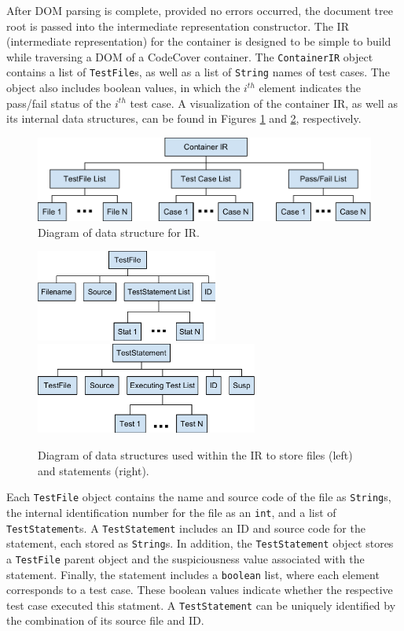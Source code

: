 After DOM parsing is complete, provided no errors occurred, the document tree root is
passed into the intermediate representation constructor.  The IR (intermediate representation)
for the container is designed to be simple to build while traversing a DOM of a CodeCover
container.  The \texttt{ContainerIR} object contains a list of \texttt{TestFile}s, as well
as a list of \texttt{String} names of test cases.  The object also includes boolean values,
in which the $i^{th}$ element indicates the pass/fail status of the $i^{th}$ test case.  A 
visualization of the container IR, as well as its internal data structures, can be found in 
Figures \ref{fig:ir} and \ref{fig:ir2}, respectively.  

\begin{figure}[tb]
\centering
\includegraphics[width=0.8\linewidth]{img/ContainerIR.pdf}
\caption{Diagram of data structure for IR.}
\label{fig:ir}
\end{figure}

\begin{figure}[tb]
\centering
\includegraphics[height=30mm]{img/TestFile.pdf}
\hspace{0.1\linewidth}
\includegraphics[height=30mm]{img/TestStatement.pdf}
\caption{Diagram of data structures used within the IR to store files (left) and 
statements (right).}
\label{fig:ir2}
\end{figure}

Each \texttt{TestFile} object contains the name and source code of the file as \texttt{String}s, the internal identification number for the file as an \texttt{int}, and a list of \texttt{TestStatement}s.  
A \texttt{TestStatement} includes an ID and source code for the statement, each stored as \texttt{String}s.  In addition, the \texttt{TestStatement} object stores a \texttt{TestFile} 
parent object and the suspiciousness value associated with the statement.  Finally, the statement 
includes a \texttt{boolean} list, where each element corresponds to a test case.  These boolean 
values indicate whether the respective test case executed this statment.  A \texttt{TestStatement} 
can be uniquely identified by the combination of its source file and ID.

